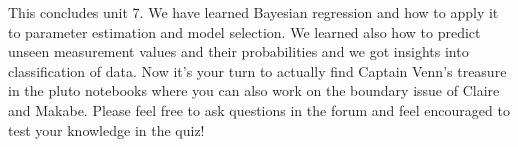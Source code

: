 \documentclass[12pt, a4paper]{scrartcl}
\begin{document}
This concludes unit 7. We have learned Bayesian regression and how to
apply it to parameter estimation and model selection. 
We learned also how to predict unseen measurement values and their probabilities and we got insights into classification of data.
Now it’s your turn to actually find Captain Venn’s treasure in the pluto
notebooks where you can also work on the boundary issue of Claire and
Makabe.
Please feel free to ask questions in the forum and feel encouraged to test your
knowledge in the quiz!
\end{document}
